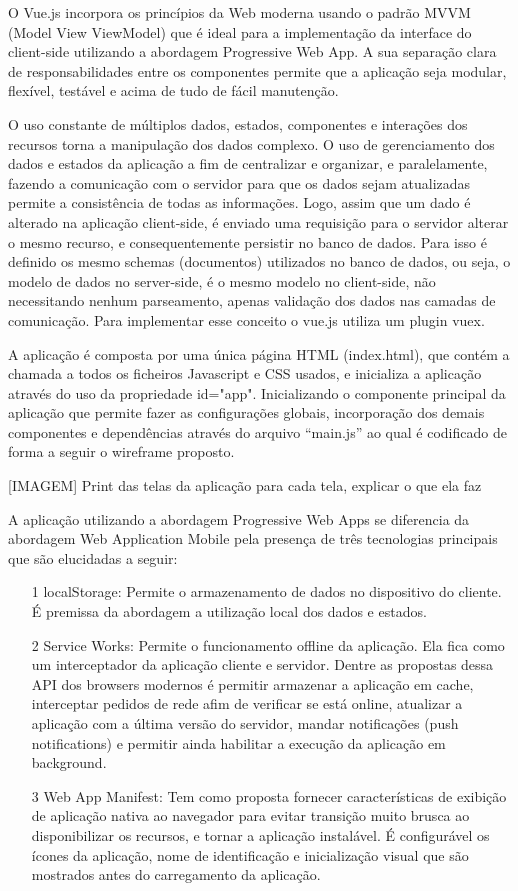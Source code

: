 O Vue.js incorpora os princípios da Web moderna usando o padrão MVVM (Model View ViewModel) que é ideal para a implementação da interface do client-side utilizando a abordagem Progressive Web App. A sua separação clara de responsabilidades entre os componentes permite que a aplicação seja modular, flexível, testável e acima de tudo de fácil manutenção.

O uso constante de múltiplos dados, estados, componentes e interações dos recursos torna a manipulação dos dados complexo. O uso de gerenciamento dos dados e estados da aplicação a fim de centralizar e organizar, e paralelamente, fazendo a comunicação com o servidor para que os dados sejam atualizadas permite a consistência de todas as informações. Logo, assim que um dado é alterado na aplicação client-side, é enviado uma requisição para o servidor alterar o mesmo recurso, e consequentemente persistir no banco de dados. Para isso é definido os mesmo schemas (documentos) utilizados no banco de dados, ou seja, o modelo de dados no server-side, é o mesmo modelo no client-side, não necessitando nenhum parseamento, apenas validação dos dados nas camadas de comunicação. Para implementar esse conceito o vue.js utiliza um plugin vuex.

A aplicação é composta por uma única página HTML (index.html), que contém a chamada a todos os ficheiros Javascript e CSS usados, e inicializa a aplicação através do uso da propriedade id="app". Inicializando o componente principal  da aplicação que permite fazer as configurações globais, incorporação dos demais componentes e dependências através do arquivo “main.js” ao qual é codificado de forma a seguir o wireframe proposto.


[IMAGEM]  Print das telas da aplicação para cada tela, explicar o que ela faz

A aplicação utilizando a abordagem Progressive Web Apps se diferencia da abordagem Web Application Mobile pela presença de três tecnologias principais que são elucidadas a seguir:

\begin{enumerate}
	\item [1] localStorage: Permite o armazenamento de dados no dispositivo do cliente. É premissa da abordagem a utilização local dos dados e estados.
	\item [2] Service Works: Permite o funcionamento offline da aplicação. Ela fica como um interceptador da aplicação cliente e servidor. Dentre as propostas dessa API dos browsers modernos é permitir armazenar a aplicação em cache, interceptar pedidos de rede afim de verificar se está online, atualizar a aplicação com a última versão do servidor, mandar notificações (push notifications) e permitir ainda habilitar a execução da aplicação em background.
	\item [3] Web App Manifest: Tem como proposta fornecer características de exibição de aplicação nativa ao navegador para evitar transição muito brusca ao disponibilizar os recursos, e tornar a aplicação instalável. É configurável os ícones da aplicação, nome de identificação e inicialização visual que são mostrados antes do carregamento da aplicação.
\end{enumerate}

